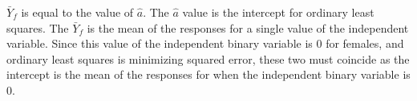 \documentclass[12pt,twoside]{article}
\begin{document}
\begin{problems}
\begin{problemparts}
\problempart %

$\bar{Y}_f$ is equal to the value of $\hat{a}$. The $\hat{a}$ value is the
intercept for ordinary least squares. The $\bar{Y}_f$ is the mean of the 
responses for a single value of the independent variable. Since this value of
the independent binary variable is $0$ for females, and ordinary least squares
is minimizing squared error, these two must coincide as the intercept is the
mean of the responses for when the independent binary variable is $0$.

\end{problemparts}

\end{problems}
\end{document}
